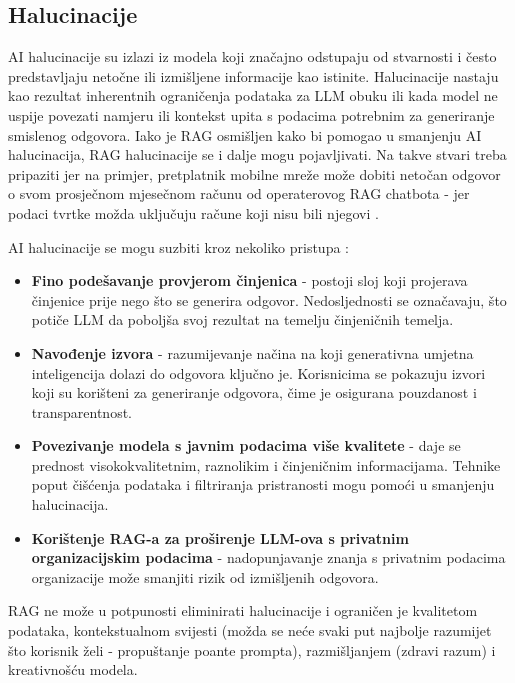 \documentclass[]{foi}
\begin{document}
\subsection{Halucinacije}

AI halucinacije su izlazi iz modela koji značajno odstupaju od stvarnosti i često predstavljaju netočne ili izmišljene informacije kao istinite. Halucinacije nastaju kao rezultat inherentnih ograničenja
podataka za LLM obuku ili kada model ne uspije povezati namjeru ili kontekst upita s podacima potrebnim za generiranje smislenog odgovora. Iako je RAG osmišljen kako bi pomogao u smanjenju
AI halucinacija, RAG halucinacije se i dalje mogu pojavljivati. Na takve stvari treba pripaziti jer na primjer, pretplatnik mobilne mreže može dobiti netočan odgovor o svom prosječnom mjesečnom
računu od operaterovog RAG chatbota - jer podaci tvrtke možda uključuju račune koji nisu bili njegovi \cite{rag_hallucination2025}. 

AI halucinacije se mogu suzbiti kroz nekoliko pristupa \cite{rag_hallucination2025}:

\begin{itemize}
    \item \textbf{Fino podešavanje provjerom činjenica} - postoji sloj koji projerava činjenice prije nego što se generira odgovor. Nedosljednosti se označavaju, što potiče LLM da poboljša svoj 
    rezultat na temelju činjeničnih temelja. 
    \item \textbf{Navođenje izvora} - razumijevanje načina na koji generativna umjetna inteligencija dolazi do odgovora ključno je. Korisnicima se pokazuju izvori koji su korišteni za generiranje odgovora,
    čime je osigurana pouzdanost i transparentnost. 
    \item \textbf{Povezivanje modela s javnim podacima više kvalitete} - daje se prednost visokokvalitetnim, raznolikim i činjeničnim informacijama. Tehnike poput čišćenja podataka i filtriranja
    pristranosti mogu pomoći u smanjenju halucinacija.
    \item \textbf{Korištenje RAG-a za proširenje LLM-ova s privatnim organizacijskim podacima} - nadopunjavanje znanja s privatnim podacima organizacije može smanjiti rizik od izmišljenih odgovora.
\end{itemize}

RAG ne može u potpunosti eliminirati halucinacije i ograničen je kvalitetom podataka, kontekstualnom svijesti (možda se neće svaki put najbolje razumijet što korisnik želi - propuštanje poante prompta),
razmišljanjem (zdravi razum) i kreativnošću modela. 
\end{document}
